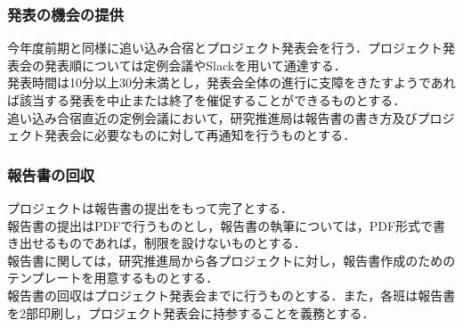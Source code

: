 \subsubsection*{発表の機会の提供}

今年度前期と同様に追い込み合宿とプロジェクト発表会を行う．プロジェクト発表会の発表順については定例会議やSlackを用いて通達する．\\発表時間は10分以上30分未満とし，発表会全体の進行に支障をきたすようであれば該当する発表を中止または終了を催促することができるものとする．\\追い込み合宿直近の定例会議において，研究推進局は報告書の書き方及びプロジェクト発表会に必要なものに対して再通知を行うものとする．

\subsubsection*{報告書の回収}

プロジェクトは報告書の提出をもって完了とする．\\報告書の提出はPDFで行うものとし，報告書の執筆については，PDF形式で書き出せるものであれば，制限を設けないものとする．\\報告書に関しては，研究推進局から各プロジェクトに対し，報告書作成のためのテンプレートを用意するものとする．\\報告書の回収はプロジェクト発表会までに行うものとする．また，各班は報告書を2部印刷し，プロジェクト発表会に持参することを義務とする．\\

